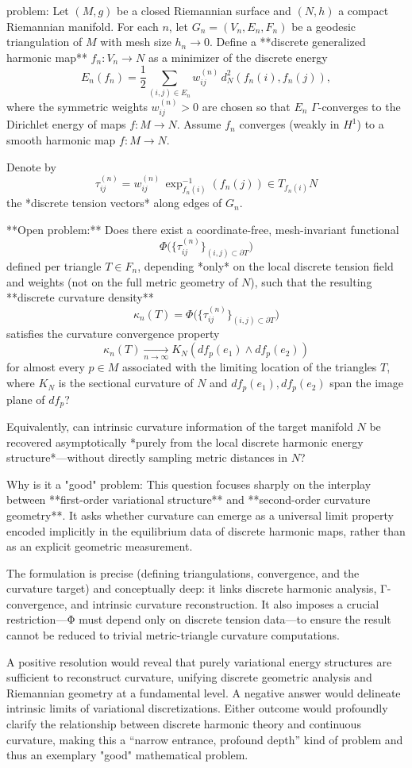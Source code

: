 problem:  
Let \( (M,g) \) be a closed Riemannian surface and \( (N,h) \) a compact Riemannian manifold.  
For each \(n\), let \(G_n=(V_n,E_n,F_n)\) be a geodesic triangulation of \(M\) with mesh size \(h_n\to 0\).  
Define a **discrete generalized harmonic map** \(f_n:V_n\to N\) as a minimizer of the discrete energy  
\[
E_n(f_n)=\frac12\!\!\sum_{(i,j)\in E_n} \!w_{ij}^{(n)}\, d_N^2(f_n(i),f_n(j)),
\]
where the symmetric weights \(w_{ij}^{(n)}>0\) are chosen so that \(E_n\) \(\Gamma\)-converges to the Dirichlet energy of maps \(f:M\to N\).  
Assume \(f_n\) converges (weakly in \(H^1\)) to a smooth harmonic map \(f:M\to N\).

Denote by
\[
\tau_{ij}^{(n)} = w_{ij}^{(n)}\, \exp^{-1}_{f_n(i)}(f_n(j)) \in T_{f_n(i)}N
\]
the *discrete tension vectors* along edges of \(G_n\).  

**Open problem:**  
Does there exist a coordinate-free, mesh-invariant functional
\[
\Phi\big(\{\tau^{(n)}_{ij}\}_{(i,j)\subset \partial T}\big)
\]
defined per triangle \(T \in F_n\), depending *only* on the local discrete tension field and weights (not on the full metric geometry of \(N\)), such that the resulting **discrete curvature density**
\[
\kappa_n(T) = \Phi\big(\{\tau^{(n)}_{ij}\}_{(i,j)\subset \partial T}\big)
\]
satisfies the curvature convergence property
\[
\kappa_n(T) \xrightarrow[n\to\infty]{} K_N(df_p(e_1)\wedge df_p(e_2))
\]
for almost every \(p\in M\) associated with the limiting location of the triangles \(T\), where \(K_N\) is the sectional curvature of \(N\) and \(df_p(e_1),df_p(e_2)\) span the image plane of \(df_p\)?  

Equivalently, can intrinsic curvature information of the target manifold \(N\) be recovered asymptotically *purely from the local discrete harmonic energy structure*—without directly sampling metric distances in \(N\)?

Why is it a "good" problem:  
This question focuses sharply on the interplay between **first-order variational structure** and **second-order curvature geometry**. It asks whether curvature can emerge as a universal limit property encoded implicitly in the equilibrium data of discrete harmonic maps, rather than as an explicit geometric measurement.  

The formulation is precise (defining triangulations, convergence, and the curvature target) and conceptually deep: it links discrete harmonic analysis, Γ-convergence, and intrinsic curvature reconstruction. It also imposes a crucial restriction—Φ must depend only on discrete tension data—to ensure the result cannot be reduced to trivial metric-triangle curvature computations.  

A positive resolution would reveal that purely variational energy structures are sufficient to reconstruct curvature, unifying discrete geometric analysis and Riemannian geometry at a fundamental level. A negative answer would delineate intrinsic limits of variational discretizations. Either outcome would profoundly clarify the relationship between discrete harmonic theory and continuous curvature, making this a “narrow entrance, profound depth” kind of problem and thus an exemplary "good" mathematical problem.